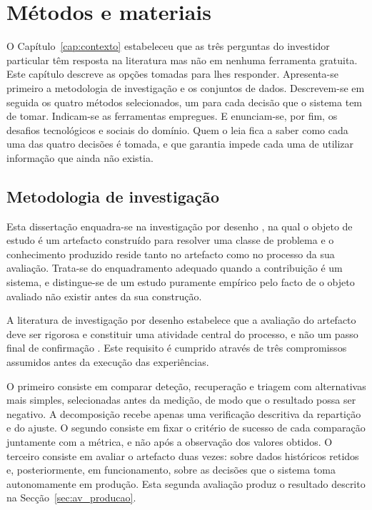 \chapter{Métodos e materiais}
\label{cap:metodologia}

O Capítulo~\ref{cap:contexto} estabeleceu que as três perguntas do investidor particular têm
resposta na literatura mas não em nenhuma ferramenta gratuita. Este capítulo descreve as opções
tomadas para lhes responder. Apresenta-se primeiro a metodologia de investigação e os conjuntos de
dados. Descrevem-se em seguida os quatro métodos selecionados, um para cada decisão que o sistema
tem de tomar. Indicam-se as ferramentas empregues. E enunciam-se, por fim, os desafios tecnológicos
e sociais do domínio. Quem o leia fica a saber como cada uma das quatro decisões é tomada, e que garantia impede cada uma de utilizar informação que ainda não existia.

\section{Metodologia de investigação}
\label{sec:met_metodologia}

Esta dissertação enquadra-se na investigação por desenho \autocite{hevner2004design}, na qual o
objeto de estudo é um artefacto construído para resolver uma classe de problema e o conhecimento
produzido reside tanto no artefacto como no processo da sua avaliação. Trata-se do enquadramento
adequado quando a contribuição é um sistema, e distingue-se de um estudo puramente empírico pelo
facto de o objeto avaliado não existir antes da sua construção.

A literatura de investigação por desenho estabelece que a avaliação do artefacto deve ser rigorosa
e constituir uma atividade central do processo, e não um passo final de confirmação
\autocite{hevner2004design, peffers2007dsrm}. Este requisito é cumprido através de três
compromissos assumidos antes da execução das experiências.

O primeiro consiste em comparar deteção, recuperação e triagem com alternativas mais simples,
selecionadas antes da medição, de modo que o resultado possa ser negativo. A decomposição recebe
apenas uma verificação descritiva da repartição e do ajuste. O segundo
consiste em fixar o critério de sucesso de cada comparação juntamente com a métrica, e não após a
observação dos valores obtidos. O terceiro consiste em avaliar o artefacto duas vezes: sobre dados
históricos retidos e, posteriormente, em funcionamento, sobre as decisões que o sistema toma
autonomamente em produção. Esta segunda avaliação produz o
resultado descrito na Secção~\ref{sec:av_producao}.

